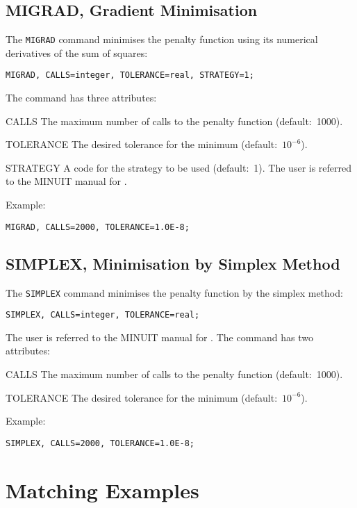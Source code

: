 \subsection{MIGRAD, Gradient Minimisation}
The \texttt{MIGRAD} command minimises the penalty
function using its numerical derivatives of the sum of squares:
\begin{verbatim}
MIGRAD, CALLS=integer, TOLERANCE=real, STRATEGY=1;
\end{verbatim}
The command has three attributes:
\begin{description}
\item{CALLS}
  The maximum number of calls to the penalty function (default:~1000).
\item{TOLERANCE}
  The desired tolerance for the minimum (default:~\(10^{-6}\)).
\item{STRATEGY}
  A code for the strategy to be used (default:~1).
  The user is referred to the MINUIT manual for
  . 
\end{description}
Example:
\begin{verbatim}
MIGRAD, CALLS=2000, TOLERANCE=1.0E-8;
\end{verbatim}

\subsection{SIMPLEX, Minimisation by Simplex Method}
The \texttt{SIMPLEX} command minimises the penalty
function by the simplex method:
\begin{verbatim}
SIMPLEX, CALLS=integer, TOLERANCE=real;
\end{verbatim}
The user is referred to the MINUIT manual for
. 
The command has two attributes:
\begin{description}
\item{CALLS}
  The maximum number of calls to the penalty function (default:~1000).
\item{TOLERANCE}
  The desired tolerance for the minimum (default:~\(10^{-6}\)).
\end{description}
Example:
\begin{verbatim}
SIMPLEX, CALLS=2000, TOLERANCE=1.0E-8;
\end{verbatim}

\section{Matching Examples}

